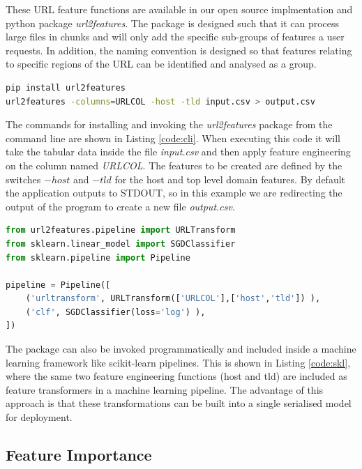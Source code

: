 \documentclass{aircc}
\begin{document}
These URL feature functions are available in our open source implmentation and 
python package \emph{url2features}. 
The package is designed such that it can process large files in chunks and will 
only add the specific sub-groups of
features a user requests. In addition, the naming convention is designed so that 
features relating to specific
regions of the URL can be identified and analysed as a group.

\begin{lstlisting}[language=Bash,label={code:cli}, caption=Install and invoke the url2features package from CLI]
pip install url2features
url2features -columns=URLCOL -host -tld input.csv > output.csv
\end{lstlisting}

The commands for installing and invoking the \emph{url2features} package from the 
command line are shown in Listing \ref{code:cli}. 
When executing this code it will take the tabular data inside the file 
\emph{input.csv} and then apply feature 
engineering on the column named \emph{URLCOL}. 
The features to be created are defined by the switches 
$-host$ and $-tld$ for the host and top level domain features. 
By default the application outputs to
STDOUT, so in this example we are redirecting the output of the program to 
create a new file \emph{output.csv}. 

\begin{lstlisting}[language=Python,label={code:skl}, caption=Usage of url2features with scikit-learn pipelines ]
from url2features.pipeline import URLTransform
from sklearn.linear_model import SGDClassifier
from sklearn.pipeline import Pipeline

pipeline = Pipeline([
    ('urltransform', URLTransform(['URLCOL'],['host','tld']) ),
    ('clf', SGDClassifier(loss='log') ),
])
\end{lstlisting}

The package can also be invoked programmatically and included inside a machine 
learning framework like 
scikit-learn pipelines\cite{pedregosa2011scikit}. 
This is shown in Listing \ref{code:skl}, where the
same two feature engineering functions (host and tld) are included 
as feature transformers in a machine learning pipeline. 
The advantage of this approach is that these transformations can be built into a single
serialised model for deployment.

\subsection{Feature Importance}
\end{document}
